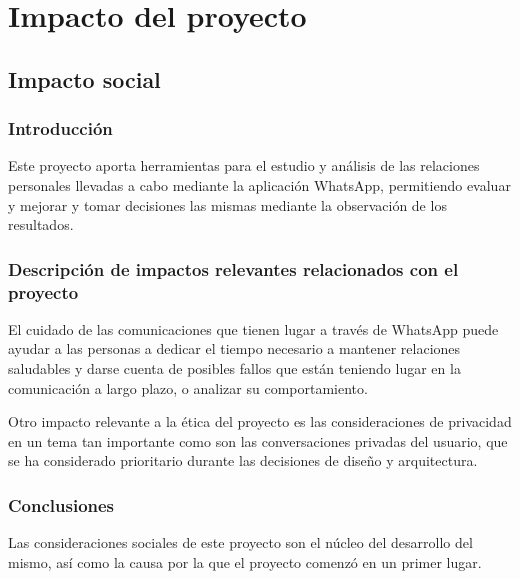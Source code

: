 \chapter{Impacto del proyecto} \label{chap:impact}

\section{Impacto social} \label{sec:social_impact}

\subsection{Introducción}

Este proyecto aporta herramientas para el estudio y análisis de las relaciones personales llevadas a cabo mediante la aplicación WhatsApp, permitiendo evaluar y mejorar y tomar decisiones las mismas mediante la observación de los resultados.

\subsection{Descripción de impactos relevantes relacionados con el proyecto}

El cuidado de las comunicaciones que tienen lugar a través de WhatsApp puede ayudar a las personas a dedicar el tiempo necesario a mantener relaciones saludables y darse cuenta de posibles fallos que están teniendo lugar en la comunicación a largo plazo, o analizar su comportamiento.

Otro impacto relevante a la ética del proyecto es las consideraciones de privacidad en un tema tan importante como son las conversaciones privadas del usuario, que se ha considerado prioritario durante las decisiones de diseño y arquitectura.

\subsection{Conclusiones}

Las consideraciones sociales de este proyecto son el núcleo del desarrollo del mismo, así como la causa por la que el proyecto comenzó en un primer lugar.